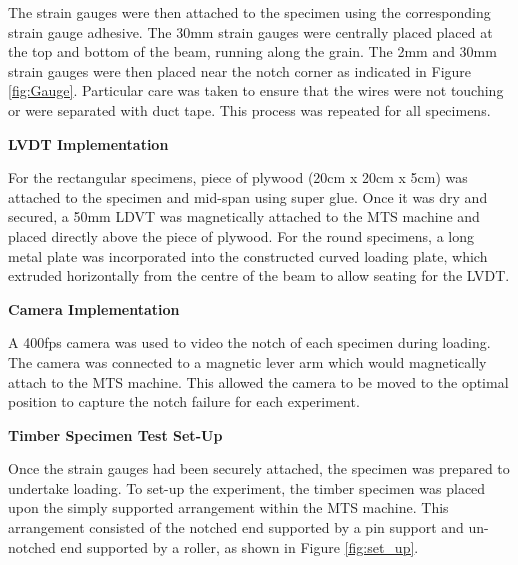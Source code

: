 \documentclass[11pt,a4paper]{article}
\numberwithin{equation}{subsection}
\begin{document}
\vspace*{\baselineskip}

\noindent
The strain gauges were then attached to the specimen using the corresponding strain gauge adhesive. The 30mm strain gauges were centrally placed placed at the top and bottom of the beam, running along the grain. The 2mm and 30mm strain gauges were then placed near the notch corner as indicated in Figure \ref{fig:Gauge}. Particular care was taken to ensure that the wires were not touching or were separated with duct tape. This process was repeated for all specimens.

\vspace*{\baselineskip}

\noindent
\textbf{LVDT Implementation}\par
\noindent
For the rectangular specimens, piece of plywood (20cm x 20cm x 5cm) was attached to the specimen and mid-span using super glue. Once it was dry and secured, a 50mm LDVT was magnetically attached to the MTS machine and placed directly above the piece of plywood. For the round specimens, a long metal plate was incorporated into the constructed curved loading plate, which extruded horizontally from the centre of the beam to allow seating for the LVDT.

\vspace*{\baselineskip}

\noindent
\textbf{Camera Implementation}\par
\noindent
A 400fps camera was used to video the notch of each specimen during loading. The camera was connected to a magnetic lever arm which would magnetically attach to the MTS machine. This allowed the camera to be moved to the optimal position to capture the notch failure for each experiment.

\vspace*{\baselineskip}

\noindent
\textbf{Timber Specimen Test Set-Up}\par
\noindent
Once the strain gauges had been securely attached, the specimen was prepared to undertake loading. To set-up the experiment, the timber specimen was placed upon the simply supported arrangement within the MTS machine. This arrangement consisted of the notched end supported by a pin support and un-notched end supported by a roller, as shown in Figure \ref{fig:set_up}.

\vspace*{\baselineskip}
\end{document}
